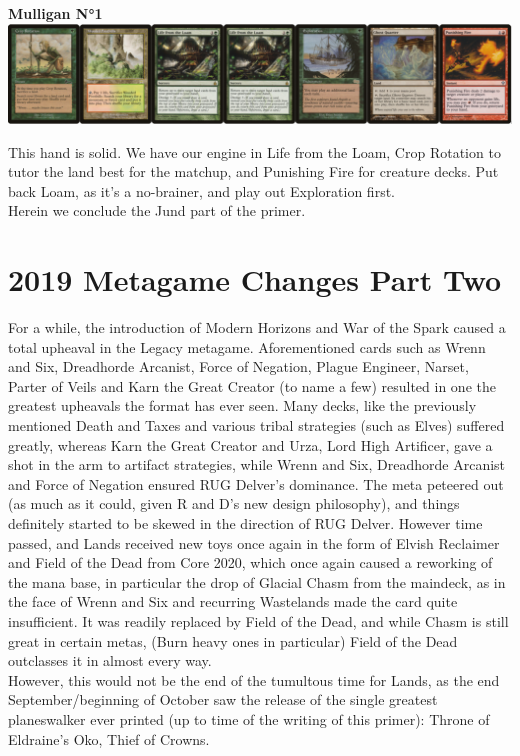 \documentclass{report}
\begin{document}
\begin{center}
\textbf{Mulligan N°1}
\includegraphics [width =\textwidth] {jundmull3}
\end{center}
This hand is solid. We have our engine in Life from the Loam, Crop Rotation to tutor the land best for the matchup, and Punishing Fire for creature decks. Put back Loam, as it's a no-brainer, and play out Exploration first.\\
Herein we conclude the Jund part of the primer. 

\chapter{2019 Metagame Changes Part Two}
For a while, the introduction of Modern Horizons and War of the Spark caused a total upheaval in the Legacy metagame. Aforementioned cards such as Wrenn and Six, Dreadhorde Arcanist, Force of Negation, Plague Engineer, Narset, Parter of Veils and Karn the Great Creator (to name a few) resulted in one the greatest upheavals the format has ever seen. Many decks, like the previously mentioned Death and Taxes and various tribal strategies (such as Elves) suffered greatly, whereas Karn the Great Creator and Urza, Lord High Artificer, gave a shot in the arm to artifact strategies, while Wrenn and Six, Dreadhorde Arcanist and Force of Negation ensured RUG Delver's dominance. The meta peteered out (as much as it could, given R and D's new design philosophy), and things definitely started to be skewed in the direction of RUG Delver. However time passed, and Lands received new toys once again in the form of Elvish Reclaimer and Field of the Dead from Core 2020, which once again caused a reworking of the mana base, in particular the drop of Glacial Chasm from the maindeck, as in the face of Wrenn and Six and recurring Wastelands made the card quite insufficient. It was readily replaced by Field of the Dead, and while Chasm is still great in certain metas, (Burn heavy ones in particular) Field of the Dead outclasses it in almost every way.\\
However, this would not be the end of the tumultous time for Lands, as the end September/beginning of October saw the release of the single greatest planeswalker ever printed (up to time of the writing of this primer): Throne of Eldraine's Oko, Thief of Crowns.\\\\
\end{document}
